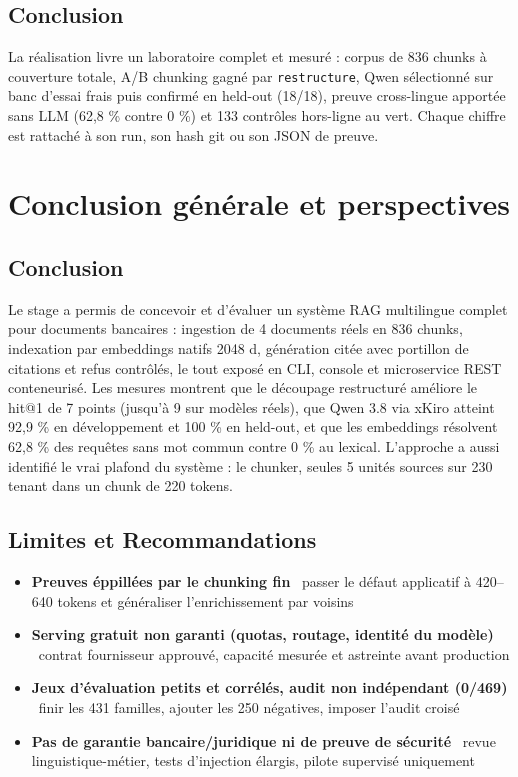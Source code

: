 \documentclass[a4paper,12pt]{report}
\begin{document}
\section{Conclusion}
La r\'ealisation livre un laboratoire complet et mesur\'e : corpus de 836 chunks \`a couverture totale, A/B chunking gagn\'e par \texttt{restructure}, Qwen s\'electionn\'e sur banc d'essai frais puis confirm\'e en held-out (18/18), preuve cross-lingue apport\'ee sans LLM (62,8 \% contre 0 \%) et 133 contr\^oles hors-ligne au vert. Chaque chiffre est rattach\'e \`a son run, son hash git ou son JSON de preuve.

\chapter{Conclusion g\'en\'erale et perspectives}
\section*{Conclusion}
Le stage a permis de concevoir et d'\'evaluer un syst\`eme RAG multilingue complet pour documents bancaires : ingestion de 4 documents r\'eels en 836 chunks, indexation par embeddings natifs 2048 d, g\'en\'eration cit\'ee avec portillon de citations et refus contr\^ol\'es, le tout expos\'e en CLI, console et microservice REST conteneuris\'e. Les mesures montrent que le d\'ecoupage restructur\'e am\'eliore le hit@1 de 7 points (jusqu'\`a 9 sur mod\`eles r\'eels), que Qwen 3.8 via xKiro atteint 92,9 \% en d\'eveloppement et 100 \% en held-out, et que les embeddings r\'esolvent 62,8 \% des requ\^etes sans mot commun contre 0 \% au lexical. L'approche a aussi identifi\'e le vrai plafond du syst\`eme : le chunker, seules 5 unit\'es sources sur 230 tenant dans un chunk de 220 tokens.

\section*{Limites et Recommandations}

\begin{itemize}
    \item \textbf{Preuves \'eppill\'ees par le chunking fin} \rightarrow\ passer le d\'efaut applicatif \`a 420--640 tokens et g\'en\'eraliser l'enrichissement par voisins
    \item \textbf{Serving gratuit non garanti (quotas, routage, identit\'e du mod\`ele)} \rightarrow\ contrat fournisseur approuv\'e, capacit\'e mesur\'ee et astreinte avant production
    \item \textbf{Jeux d'\'evaluation petits et corr\'el\'es, audit non ind\'ependant (0/469)} \rightarrow\ finir les 431 familles, ajouter les 250 n\'egatives, imposer l'audit crois\'e
    \item \textbf{Pas de garantie bancaire/juridique ni de preuve de s\'ecurit\'e} \rightarrow\ revue linguistique-m\'etier, tests d'injection \'elargis, pilote supervis\'e uniquement
\end{itemize}
\end{document}
